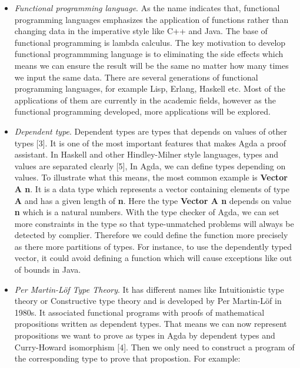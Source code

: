 \documentclass{article}
\newcommand{\Varid}[1]{\mathit{#1}}
\def\resethooks{%
  \global\let\SaveRestoreHook\empty
  \global\let\ColumnHook\empty}
\let\hspre\empty
\let\hspost\empty
\renewcommand\Varid[1]{\mathord{\textsf{#1}}}
\begin{document}
\begin{itemize}
\item \textit{Functional programming language}. As the name indicates that, functional programming languages emphasizes the application of functions rather than changing data in the imperative style like C++ and Java. The base of functional programming is lambda calculus. The key motivation to develop functional programmming language is to eliminating the side effects which means we can ensure the result will be the same no matter how many times we input the same data. There are several generations of functional programming languages, for example Lisp, Erlang, Haskell etc. Most of the applications of them are currently in the academic fields, however as the functional programming developed, more applications will be explored.

\item \textit{Dependent type}. Dependent types are types that depends on values of other types [3]. It is one of the most important features that makes Agda a proof assistant. In Haskell and other Hindley-Milner style languages, types and values are separated clearly [5], In Agda, we can define types depending on values. To illustrate what this means, the most common example is \textbf{Vector A n}. It is a data type which represents a vector containing elements of type \textbf{A} and has a given length of \textbf{n}. Here the type \textbf{Vector A n} depends on value \textbf{n} which is a natural numbers. With the type checker of Agda, we can set more constraints in the type so that type-unmatched problems will always be detected by complier. Therefore we could define the function more precisely as there more partitions of types. For instance, to use the dependently typed vector, it could avoid defining a function which will cause exceptions like out of bounds in Java.

\item \textit{Per Martin-Löf Type Theory}. It has different names like Intuitionistic type theory or Constructive type theory and is developed by Per Martin-Löf in 1980s. It associated functional programs with proofs of mathematical propositions written as dependent types. That means we can now represent propositions we want to prove as types in Agda by dependent types and Curry-Howard isomorphism [4]. Then we only need to construct a program of the corresponding type to prove that propostion. For example:

\resethooks


\end{itemize}
\end{document}

